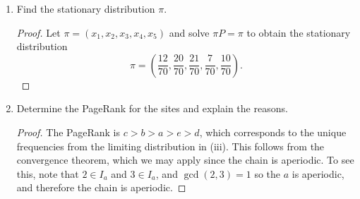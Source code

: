 \documentclass[oneside,reqno]{amsart}
\theoremstyle{definition}
\begin{document}
\begin{enumerate}
\begin{proof}
To demonstrate that this chain is irreducible, we show by inspection that for any initial state $i$ it is there is a nonzero probability of reaching any other state, i.e., the vertex set (state space) $V$ is a single communicating class. For the chain started at $a$, 
\begin{align*}
	p(a,b) &= 1/2>0 \\
	p(a,c) &= 1/2>0 \\
	p(a,d) &= p(a,b)p(b,c)p(c,d) = 1/2 \cdot 1/2 \cdot 1/3 \cdot >0 \\
	 p(a,e) &=p(a,b)p(b,e) = 1/2 \cdot 1/2>0. 
\end{align*}
For the chain started at $b$, 
\begin{align*}
	p(b,a) &= p(b,c)p(c,a) = 1/2 \cdot 1/3 >0 \\
	p(b,c) &= 1/2 > 0 \\
	p(b,d) &= p(b,c)p(c,d) = 1/2 \cdot 1/3 >0 \\
	p(b,e) &= 1/2 > 0.
\end{align*} 
For the chain started in $c$,
\begin{align*}
	p(c,a) &= 1/3>0 \\
	p(c,b) &= p(c,a)p(a,b) = 1/2 \cdot 1/2 > 0 \\
	p(c,d) &= 1/3>0 \\
	p(c,e) &= p(a,c)p(a,b)p(b,e) =1/3 \cdot 1/2 \cdot 1/2 >0. 
\end{align*}
For the chain started in $d$, 
\[
	p(d,a) =p(d,b) p(b,e) p(e,a) = 1 \cdot 1/2 \cdot 1/2 > 0,
\]
and as just shown, every state is accessible from $b$ and hence every state is accessible from $d$. For the chain started in $e$, 
\[
	p(e,a) = 1/2>0,
\] 
and again since every state is accessible from state $a$, every state is also accessible from $d$. Since every state leads to every other states, $G$ contains a cycle: $a \to c \to d \to b \to e \to a$. Therefore, all states communicate with each other, and the chain is irreducible.
\end{proof}

\item
Find the stationary distribution $\pi$. 

\begin{proof}
Let $\pi = (x_1, x_2, x_3, x_4, x_5)$ and solve $\pi P = \pi$ to obtain the stationary distribution 
\[
	\pi = \left(\frac{12}{70}, \frac{20}{70}, \frac{21}{70},\frac{7}{70}, \frac{10}{70} \right).
\]
\end{proof}

\item
Determine the PageRank for the sites and explain the reasons.

\begin{proof}
The PageRank is $c > b > a > e > d$, which corresponds to the unique frequencies from the limiting distribution in (iii). This follows from the convergence theorem, which we may apply since the chain is aperiodic. To see this, note that $2 \in I_a$ and $3 \in I_a$, and $\gcd(2,3) = 1$ so the $a$ is aperiodic, and therefore the chain is aperiodic.
\end{proof}
\end{enumerate}
\end{document}
